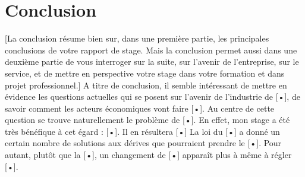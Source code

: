 \documentclass{article}
\begin{document}
\part{Conclusion}
[La conclusion résume bien sur, dans une première partie, les principales conclusions de votre rapport de stage. Mais la 
conclusion permet aussi dans une deuxième partie de vous interroger sur la suite, sur l’avenir de l’entreprise, sur le 
service, et de mettre en perspective votre stage dans votre formation et dans projet professionnel.]
A titre de conclusion, il semble intéressant de mettre en évidence les questions actuelles qui se posent sur l’avenir de 
l’industrie de [•], de savoir comment les acteurs économiques vont faire [•]. Au centre de cette question se trouve 
naturellement le problème de [•]. En effet, mon stage a été très bénéfique à cet égard : [•]. Il en résultera [•]
La loi du [•] a donné un certain nombre de solutions aux dérives que pourraient prendre le [•]. Pour autant, plutôt 
que la [•], un changement de [•] apparaît plus à même à régler [•].
\end{document}
